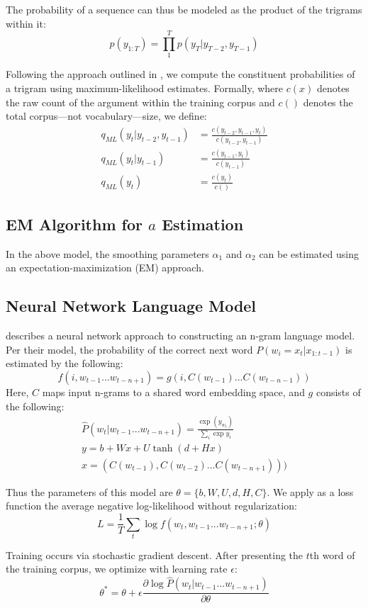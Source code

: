 \documentclass[11pt]{article}
\begin{document}
The probability of a sequence can thus be modeled as the product of the trigrams within it:
$$ p(y_{1:T}) = \prod_{1}^{T} p(y_T|y_{T-2},y_{T-1}) $$

Following the approach outlined in \cite{collins2013}, we compute the constituent probabilities of a trigram using maximum-likelihood estimates. Formally, where $c(x)$ denotes the raw count of the argument within the training corpus and $c()$ denotes the total corpus---not vocabulary---size, we define:
\begin{align*}
  q_{ML}(y_t|y_{t-2},y_{t-1}) &= \frac{c(y_{t-2}, y_{t-1}, y_t)}{c(y_{t-2}, y_{t-1})} \\
  q_{ML}(y_t|y_{t-1}) &= \frac{c(y_{t-1}, y_t)}{c(y_{t-1})} \\
  q_{ML}(y_t) &= \frac{c(y_t)}{c()}
\end{align*}

\subsection{EM Algorithm for $a$ Estimation}

In the above model, the smoothing parameters $\alpha_1$ and $\alpha_2$ can be estimated using an expectation-maximization (EM) approach.


\subsection{Neural Network Language Model}

\cite{bengio2003neural} describes a neural network approach to constructing an n-gram language model. Per their model, the probability of the correct next word $P(w_i = x_t|x_{1:t-1})$ is estimated by the following:
$$f(i, w_{t-1}...w_{t-n+1}) = g(i, C(w_{t-1})...C(w_{t-n-1}))$$
Here, $C$ maps input n-grams to a shared word embedding space, and $g$ consists of the following:
\begin{align*}
  \hat{P}(w_t|w_{t-1}...w_{t-n+1})=\frac{\exp(y_{w_t})}{\sum_{i}\exp{y_i}} \\
  y = b+Wx+U\tanh(d+Hx) \\
  x = (C(w_{t-1}),C(w_{t-2})...C(w_{t-n+1})))
\end{align*}

Thus the parameters of this model are $\theta=\{b,W,U,d,H,C\}$. We apply as a loss function the average negative log-likelihood without regularization:
$$L=\frac{1}{T} \sum_{t} \log f(w_t,w_{t-1}...w_{t-n+1}; \theta)$$

Training occurs via stochastic gradient descent. After presenting the $t$th word of the training corpus, we optimize with learning rate $\epsilon$:
$$\theta^{*} = \theta + \epsilon \frac{\partial \log \hat{P}(w_t|w_{t-1}...w_{t-n+1})}{\partial \theta}$$
\end{document}
